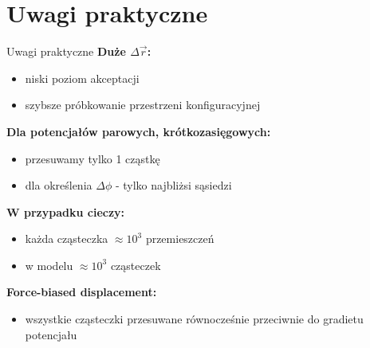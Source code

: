 \section{Uwagi praktyczne}
	\begin{frame}{Uwagi praktyczne}
		\textbf{Duże $\Delta\vec{r}$:}
		\begin{itemize}
			\item niski poziom akceptacji
			\item szybsze próbkowanie przestrzeni konfiguracyjnej
		\end{itemize}
		
		\textbf{Dla potencjałów parowych, krótkozasięgowych:}
		\begin{itemize}
			\item przesuwamy tylko 1 cząstkę
			\item dla określenia $\Delta\phi$ - tylko najbliżsi sąsiedzi
		\end{itemize}
		
		\textbf{W przypadku cieczy:}
		\begin{itemize}
			\item każda cząsteczka $\approx 10^3$ przemieszczeń
			\item w modelu $\approx 10^3$ cząsteczek
		\end{itemize}	
		
		\textbf{Force-biased displacement:}
		\begin{itemize}
			\item wszystkie cząsteczki przesuwane równocześnie przeciwnie do gradietu potencjału
		\end{itemize}
		
	\end{frame}







